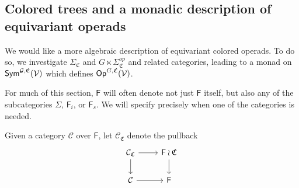 \documentclass[a4paper,10pt
,draft
]{article}%
\renewcommand{\1}{\eta}%
\newcommand{\SC}{\Sigma_{\mathfrak C}}
\begin{document}
\subsection{Colored trees and a monadic description of equivariant operads}
\label{COMEGA_SEC}


We would like a more algebraic description of equivariant colored operads.
To do so, we investigate $\SC$ and $G \ltimes \Sigma_{\mathfrak C}^{op}$ and related categories,
leading to a monad on $\mathsf{Sym}^{\mathcal{G}, \mathfrak C}(\mathcal V)$ which defines $\mathsf{Op}^{G, \mathfrak C}(\mathcal V)$.


\begin{remark}
      For much of this section, $\mathsf F$ will often denote not just $\mathsf F$ itself, but also any of the subcategories
      $\Sigma$, $\mathsf F_i$, or $\mathsf F_s$.
      We will specify precisely when one of the categories is needed.
\end{remark}

\begin{definition}
      Given a category $\mathcal C$ over $\mathsf F$, let $\mathcal C_{\mathfrak C}$ denote the pullback
      \begin{equation}
            \begin{tikzcd}
                  \mathcal C_{\mathfrak C} \arrow[r] \arrow[d]
                  &
                  \mathsf F \wr \mathfrak C \arrow[d]
                  \\
                  \mathcal C \arrow[r]
                  &
                  \mathsf F
            \end{tikzcd}
      \end{equation}
\end{definition}
\end{document}

